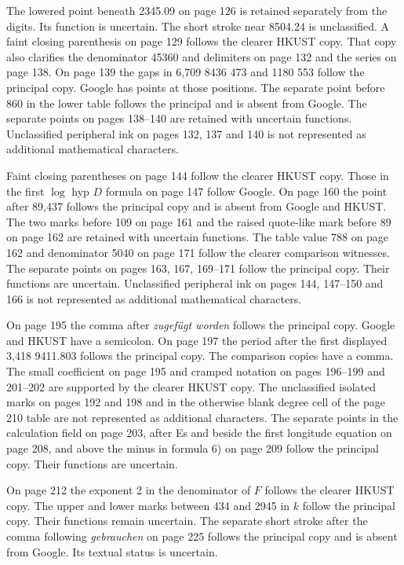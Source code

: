 The lowered point beneath 2345.09 on page 126 is retained separately
from the digits. Its function is uncertain. The short stroke near 8504.24
is unclassified. A faint closing parenthesis on page 129 follows the
clearer HKUST copy. That copy also clarifies the denominator 45360 and
delimiters on page 132 and the series on page 138.
On page 139 the gaps in 6,709 8436 473 and 1180 553 follow the principal
copy. Google has points at those positions. The separate point before
860 in the lower table follows the principal and is absent from Google.
The separate points on pages 138--140 are retained with uncertain functions.
Unclassified peripheral ink on pages 132, 137 and 140 is not represented
as additional mathematical characters.

Faint closing parentheses on page 144 follow the clearer HKUST copy. Those in the first \(\log\) hyp \(D\) formula on page 147 follow Google.
On page 160 the point after 89,437 follows the principal copy and is absent
from Google and HKUST. The two marks before 109 on page 161 and the
raised quote-like mark before 89 on page 162 are retained with uncertain
functions. The table value 788 on page 162 and denominator 5040 on
page 171 follow the clearer comparison witnesses. The separate points
on pages 163, 167, 169--171 follow the principal copy. Their functions are uncertain. Unclassified peripheral ink on pages 144, 147--150 and
166 is not represented as additional mathematical characters.

On page 195 the comma after \textit{zugefügt worden} follows the principal copy. Google and HKUST have a semicolon. On page 197 the period after the first
displayed 3,418 9411.803 follows the principal copy. The comparison copies have a comma.
The small coefficient on page 195 and cramped notation on pages 196--199
and 201--202 are supported by the clearer HKUST copy. The unclassified
isolated marks on pages 192 and 198 and in the otherwise blank degree cell
of the page 210 table are not represented as additional characters.
The separate points in the calculation field on page 203, after Es and
beside the first longitude equation on page 208, and above the minus
in formula 6) on page 209 follow the principal copy. Their functions are uncertain.

On page 212 the exponent 2 in the denominator of \(F\) follows the clearer
HKUST copy. The upper and lower marks between 434 and 2945 in \(k\)
follow the principal copy. Their functions remain uncertain. The separate
short stroke after the comma following \textit{gebrauchen} on page 225 follows
the principal copy and is absent from Google. Its textual status is uncertain.

